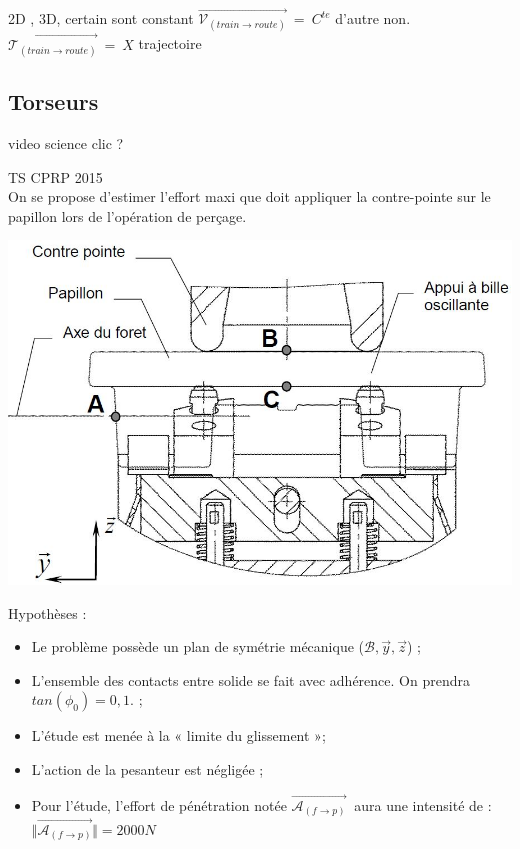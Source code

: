 \documentclass[
	11pt, %
	fleqn, %
	a4paper, %
]{LegrandOrangeBook}
\begin{document}
2D , 3D, certain sont constant $\overrightarrow{\mathcal{V}_{(train\rightarrow route)}} \ =\ C^{te}$ d'autre non. $\overrightarrow{\mathcal{T}_{(train\rightarrow route)}} \ =\ X$ trajectoire



\subsection{Torseurs}
video science clic ?

\begin{Extrait}
TS CPRP 2015 \\
On se propose d’estimer l’effort maxi que doit appliquer la contre-pointe sur le papillon lors de l’opération de perçage. \\



\noindent \begin{minipage}{0.5\textwidth}
\vspace{1cm}
\includegraphics[width=1\textwidth]{Images/2015.JPG}
\label{fig:nature}
\end{minipage}
\hspace{0.05\textwidth}
\begin{minipage}{0.4\textwidth}
Hypothèses : 
\begin{itemize}
\item Le problème possède un plan de
symétrie mécanique ($\mathcal{B}, \Vec{y}, \Vec{z}$) ;
\item L’ensemble des contacts entre
solide se fait avec adhérence. On
prendra $tan(\phi_{0}) = 0,1.$ ;
\item L’étude est menée à la « limite du
glissement »;
\item L'action de la pesanteur est
négligée ;
\item Pour l’étude, l’effort de pénétration notée $\overrightarrow{\mathcal{A}_{(f\rightarrow p)}}\ $ aura une intensité de : \\ $ \Vert \overrightarrow{\mathcal{A}_{(f\rightarrow p)}} \Vert = 2000 N\ $
\end{itemize}


\end{minipage}
\end{Extrait}
\end{document}
